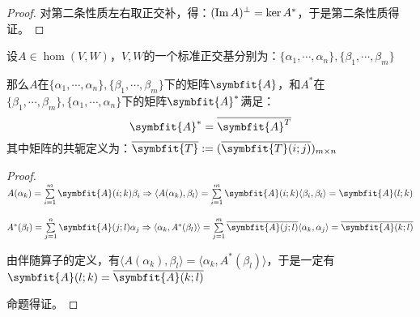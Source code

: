 \documentclass[12pt, a4paper, oneside, UTF8]{ctexbook}
\begin{document}
\begin{para}{0}
\begin{proof}
						对第二条性质左右取正交补，得：$(\operatorname{Im} A)^{\perp} = \ker A^*$，于是第二条性质得证。
					\end{proof}
				\point{}
					\begin{proposition}
						设$A \in \hom(V,W)$，$V,W$的一个标准正交基分别为：$\{\alpha_1,\cdots,\alpha_n\},\{\beta_1,\cdots,\beta_m\}$

						那么$A$在$\{\alpha_1,\cdots,\alpha_n\},\{\beta_1,\cdots,\beta_m\}$下的矩阵$\symbfit{A}$，和$A^*$在$\{\beta_1,\cdots,\beta_m\},\{\alpha_1,\cdots,\alpha_n\}$下的矩阵$\symbfit{A}^*$满足：
						\begin{equation}
							\symbfit{A}^* = \overline{\symbfit{A}^T}
						\end{equation}
						其中矩阵的共轭定义为：$\overline{\symbfit{T}}:=(\overline{\symbfit{T}(i;j)})_{m \times n}$
					\end{proposition}
					\begin{proof}
						$A(\alpha_k)=\sum\limits_{i=1}^{m} \symbfit{A}(i;k)\beta_i \Rightarrow \langle A(\alpha_k),\beta_l \rangle = \sum\limits_{i=1}^{m} \symbfit{A}(i;k)\langle \beta_i,\beta_l \rangle = \symbfit{A}(l;k)$

						$A^*(\beta_l)=\sum\limits_{j=1}^{n} \symbfit{A}(j;l)\alpha_j \Rightarrow \langle \alpha_k,A^*(\beta_l) \rangle = \sum\limits_{j=1}^{m} \overline{\symbfit{A}(j;l)}\langle \alpha_k,\alpha_j \rangle = \overline{\symbfit{A}(k;l)}$

						由伴随算子的定义，有$\langle A(\alpha_k),\beta_l \rangle = \langle \alpha_k,A^*(\beta_l) \rangle$，于是一定有$\symbfit{A}(l;k) = \overline{\symbfit{A}(k;l)}$

						命题得证。
					\end{proof}
			\end{para}
\end{document}
